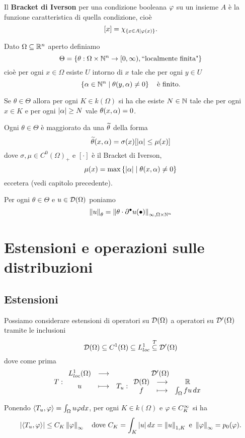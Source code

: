 \begin{definition}
Il \textbf{Bracket di Iverson} per una condizione booleana $\varphi$ su un insieme $A$ \`e la funzione caratteristica di quella condizione, cio\`e
\[[x]=\chi_{\left\{{x\in A\mid \varphi(x)}\right\}}.\]
\end{definition}

\begin{definition}[]
Dato $\Omega\subseteq\mathbb{R}^n$ aperto definiamo
\[\Theta=\left\{{\theta:\Omega\times \mathbb{N}^n\to[0,\infty), \text{``localmente finita"}}\right\}\]
cio\`e per ogni $x\in\Omega$ esiste $U$ intorno di $x$ tale che per ogni $y\in U$
\[\left\{{\alpha\in\mathbb{N}^n\mid \theta(y,\alpha)\neq 0}\right\}\quad\text{\`e finito}.\]
\end{definition}

\begin{remark}
Se $\theta\in\Theta$ allora per ogni $K\in k(\Omega)$ si ha che esiste $N\in\mathbb{N}$ tale che per ogni $x\in K$ e per ogni $\left|{\alpha}\right|\geq N$ vale $\theta(x,\alpha)=0$.
\end{remark}
\begin{remark}
Ogni $\theta\in\Theta$ \`e maggiorato da una $\widetilde{\theta}$ della forma
\[\widetilde{\theta}(x,\alpha)=\sigma(x)[\left|{\alpha}\right|\leq \mu(x)]\]
dove $\sigma,\mu\in C^0(\Omega)_+$ e $[\cdot]$ \`e il Bracket di Iverson,
\[\mu(x)=\max\left\{{\left|{\alpha}\right|\mid \theta(x,\alpha)\neq 0}\right\}\]
eccetera (vedi capitolo precedente).
\end{remark}

\begin{notation}
Per ogni $\theta\in \Theta$ e $u\in \mathcal{D}(\Omega)$ poniamo
\[\left\Vert{u}\right\Vert_\theta=\left\Vert{\theta\cdot \partial^\bullet u(\bullet)}\right\Vert_{\infty,\Omega\times \mathbb{N}^n}\]
\end{notation}

\section{Estensioni e operazioni sulle distribuzioni}
\subsection{Estensioni}
Possiamo considerare estensioni di operatori su $\mathcal{D}(\Omega)$ a operatori su $\mathcal{D}'(\Omega)$ tramite le inclusioni
\[\mathcal{D}(\Omega)\subseteq C^1(\Omega)\subseteq L^1_{loc}\overset T\subseteq \mathcal{D}'(\Omega)\]
dove come prima
\[T:\begin{array}{ccc} {L^1_{loc}(\Omega)} & \longrightarrow & {\mathcal{D}'(\Omega)}\\ {u} & \longmapsto & {T_u:\begin{array}{ccc} {\mathcal{D}(\Omega)} & \longrightarrow & {\mathbb{R}}\\ {f} & \longmapsto & {\int_\Omega fu\,dx} \end{array}} \end{array}\]
\begin{remark}
Ponendo $\left\langle {T_u,\varphi}\right\rangle=\int_\Omega u\varphi dx$, per ogni $K\in k(\Omega)$ e $\varphi\in C^\infty_K$ si ha
\[\left|{\left\langle {T_u,\varphi}\right\rangle}\right|\leq C_K\left\Vert{\varphi}\right\Vert_\infty\quad\text{dove }C_K=\int_K\left|{u}\right|dx=\left\Vert{u}\right\Vert_{1,K}\text{ e }\left\Vert{\varphi}\right\Vert_\infty=p_0(\varphi).\]
\end{remark}

